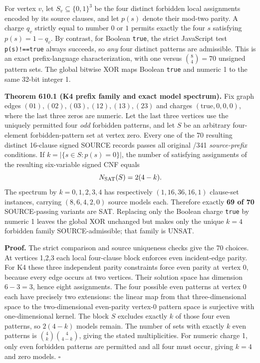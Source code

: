 \documentclass[11pt]{article}
\begin{document}
For vertex $v$, let $S_v\subseteq\{0,1\}^3$ be the four distinct forbidden local assignments encoded by its source clauses, and let $p(s)$ denote their mod-two parity. A charge $q_v$ strictly equal to number $0$ or $1$ permits exactly the four $s$ satisfying $p(s)=1-q_v$. By contrast, for Boolean \texttt{true}, the strict JavaScript test \texttt{p(s)!==true} always succeeds, so \emph{any} four distinct patterns are admissible. This is an exact prefix-language characterization, with one versus $\binom84=70$ unsigned pattern sets. The global bitwise XOR maps Boolean \texttt{true} and numeric 1 to the same 32-bit integer 1.

\textbf{Theorem 610.1 (K4 prefix family and exact model spectrum).}
Fix graph edges $(01),(02),(03),(12),(13),(23)$ and charges
$(\mathrm{true},0,0,0)$, where the last three zeros are numeric. Let the last three vertices use the uniquely permitted four \emph{odd} forbidden patterns, and let $S$ be an arbitrary four-element forbidden-pattern set at vertex zero. Every one of the 70 resulting distinct 16-clause signed SOURCE records passes all original /341 \emph{source-prefix} conditions. If $k=|\{s\in S:p(s)=0\}|$, the number of satisfying assignments of the resulting six-variable signed CNF equals
\[
N_{\rm SAT}(S)=2(4-k).
\]
The spectrum by $k=0,1,2,3,4$ has respectively $(1,16,36,16,1)$ clause-set instances, carrying $(8,6,4,2,0)$ source models each. Therefore exactly \textbf{69 of 70} SOURCE-passing variants are SAT. Replacing only the Boolean charge \texttt{true} by numeric 1 leaves the global XOR unchanged but makes only the unique $k=4$ forbidden family SOURCE-admissible; that family is UNSAT.

\textbf{Proof.} The strict comparison and source uniqueness checks give the 70 choices. At vertices 1,2,3 each local four-clause block enforces even incident-edge parity. For K4 these three independent parity constraints force even parity at vertex 0, because every edge occurs at two vertices. Their solution space has dimension $6-3=3$, hence eight assignments. The four possible even patterns at vertex 0 each have precisely two extensions: the linear map from that three-dimensional space to the two-dimensional even-parity vertex-0 pattern space is surjective with one-dimensional kernel. The block $S$ excludes exactly $k$ of those four even patterns, so $2(4-k)$ models remain. The number of sets with exactly $k$ even patterns is $\binom4k\binom4{4-k}$, giving the stated multiplicities. For numeric charge 1, only even forbidden patterns are permitted and all four must occur, giving $k=4$ and zero models. \hfill$\square$
\end{document}

